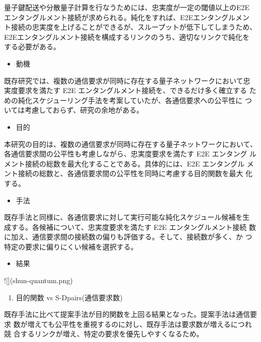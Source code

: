 \documentclass[conference]{IEEEtran}
\begin{document}
量子鍵配送や分散量子計算を行なうためには、忠実度が一定の閾値以上のE2E
エンタングルメント接続が求められる。純化をすれば、E2Eエンタングルメン
ト接続の忠実度を上げることができるが、スループットが低下してしまうため、
E2Eエンタングルメント接続を構成するリンクのうち、適切なリンクで純化を
する必要がある。

\begin{itemize}
\item 動機
\end{itemize}

既存研究では、複数の通信要求が同時に存在する量子ネットワークにおいて忠
実度要求を満たす E2E エンタングルメント接続を、できるだけ多く確立する
ための純化スケジューリング手法を考案していたが、各通信要求への公平性に
ついては考慮しておらず、研究の余地がある。

\begin{itemize}
\item 目的
\end{itemize}

本研究の目的は、複数の通信要求が同時に存在する量子ネットワークにおいて、
各通信要求間の公平性も考慮しながら、忠実度要求を満たす E2E エンタング
ルメント接続の総数を最大化することである。具体的には、E2E エンタングル
メント接続の総数と、各通信要求間の公平性を同時に考慮する目的関数を最大
化する。


\begin{itemize}
\item 手法
\end{itemize}

既存手法と同様に、各通信要求に対して実行可能な純化スケジュール候補を生
成する。各候補について、忠実度要求を満たす E2E エンタングルメント接続
数に加え、通信要求間の接続数の偏りも評価する。そして、接続数が多く、か
つ特定の要求に偏りにくい候補を選択する。


\begin{itemize}
\item 結果
\end{itemize}

![](shun-quantum.png)


\begin{enumerate}
\item 目的関数 vs S-Dpairs(通信要求数)
\end{enumerate}

既存手法に比べて提案手法が目的関数を上回る結果となった。提案手法は通信要求
数が増えても公平性を重視するのに対し、既存手法は要求数が増えるにつれ競
合するリンクが増え、特定の要求を優先しやすくなるため。
\end{document}
